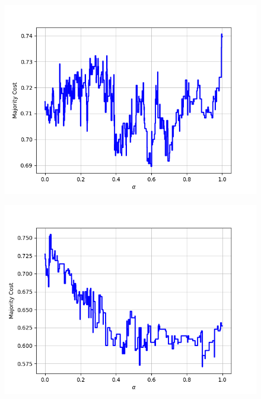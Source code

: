 \begin{figure}[H]
\begin{minipage}{.24\textwidth}
  {\includegraphics[width=\linewidth]{plots/omniglot-intra-ac-cnn/Greek}}
\end{minipage}
\begin{minipage}{.24\textwidth}
  \centering
  {\includegraphics[width=\linewidth]{plots/omniglot-intra-ac-cnn/Gujarati}}
\end{minipage}
\begin{minipage}{.24\textwidth}
  \centering

\end{minipage}
\end{figure}
